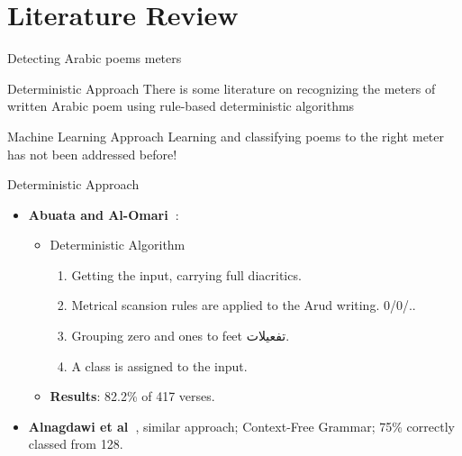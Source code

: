 \section{Literature Review}

\begin{frame}[fragile]{Detecting Arabic poems meters}

\begin{block}{Deterministic Approach}
	There is some literature on recognizing the meters of written Arabic poem using rule-based deterministic algorithms
\end{block}

\begin{block}{Machine Learning Approach}
Learning and classifying poems to the right meter has not been addressed before!
\end{block}


\end{frame}


\begin{frame}[fragile]{Deterministic Approach}
\begin{itemize}
\item <1-> [--] \textbf{Abuata and Al-Omari~\cite{Abuata2016RuleBasedAlgorithm}}:
\begin{itemize}
	\item<2-> Deterministic Algorithm
	\begin{enumerate}
		\item Getting the input, carrying full diacritics.
		\item Metrical scansion rules are applied to the Arud writing. 0/0/..
		\item Grouping zero and ones to feet \textarabic{تفعيلات}.
		\item A class is assigned  to the input.
	\end{enumerate}
	\item<3-> \textbf{\alert{Results}}: 82.2\% of 417 verses.
\end{itemize}
\item <4->[--]\textbf{Alnagdawi et al~\cite{Alnagdawi2013FindingArabicPoemMeter}}, similar approach;  Context-Free Grammar; 75\% correctly
classed from 128.
\end{itemize}
\end{frame}


